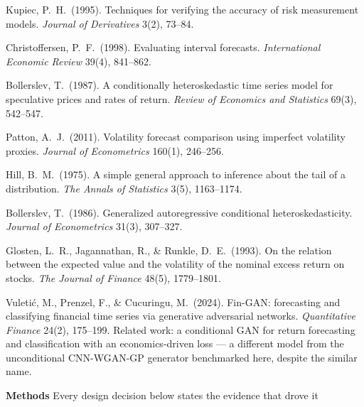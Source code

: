 \documentclass[10pt]{article}
\begin{document}
{\begin{enumerate}[label={\textbf{[\arabic*]}},leftmargin=2.8em,itemsep=4pt,parsep=0pt,topsep=2pt]
\item \hypertarget{R:34}{}%
  Kupiec, P.\ H.\ (1995). Techniques for verifying the accuracy of risk measurement models. \textit{Journal of Derivatives} 3(2), 73--84.

\item \hypertarget{R:35}{}%
  Christoffersen, P.\ F.\ (1998). Evaluating interval forecasts. \textit{International Economic Review} 39(4), 841--862.

\item \hypertarget{R:36}{}%
  Bollerslev, T.\ (1987). A conditionally heteroskedastic time series model for speculative prices and rates of return. \textit{Review of Economics and Statistics} 69(3), 542--547.

\item \hypertarget{R:37}{}%
  Patton, A.\ J.\ (2011). Volatility forecast comparison using imperfect volatility proxies. \textit{Journal of Econometrics} 160(1), 246--256.

\item \hypertarget{R:38}{}%
  Hill, B.\ M.\ (1975). A simple general approach to inference about the tail of a distribution. \textit{The Annals of Statistics} 3(5), 1163--1174.

\item \hypertarget{R:39}{}%
  Bollerslev, T.\ (1986). Generalized autoregressive conditional heteroskedasticity. \textit{Journal of Econometrics} 31(3), 307--327.

\item \hypertarget{R:40}{}%
  Glosten, L.\ R., Jagannathan, R., \& Runkle, D.\ E.\ (1993). On the relation between the expected value and the volatility of the nominal excess return on stocks. \textit{The Journal of Finance} 48(5), 1779--1801.

\item \hypertarget{R:41}{}%
  Vuleti\'{c}, M., Prenzel, F., \& Cucuringu, M.\ (2024). Fin-GAN: forecasting and classifying financial time series via generative adversarial networks. \textit{Quantitative Finance} 24(2), 175--199. Related work: a conditional GAN for return forecasting and classification with an economics-driven loss --- a different model from the unconditional CNN-WGAN-GP generator benchmarked here, despite the similar name.

\end{enumerate}
}

\clearpage

\begin{tcolorbox}[
  colback=NavyBg, colframe=NavyBg!60!black, arc=4pt,
  left=8pt, right=8pt, top=4pt, bottom=4pt,
  before skip=0pt, after skip=10pt]
{\large\bfseries\color{Navy} Methods}
\hfill{\small\color{Navy!70} Every design decision below states the evidence that drove it}
\end{tcolorbox}
\end{document}
